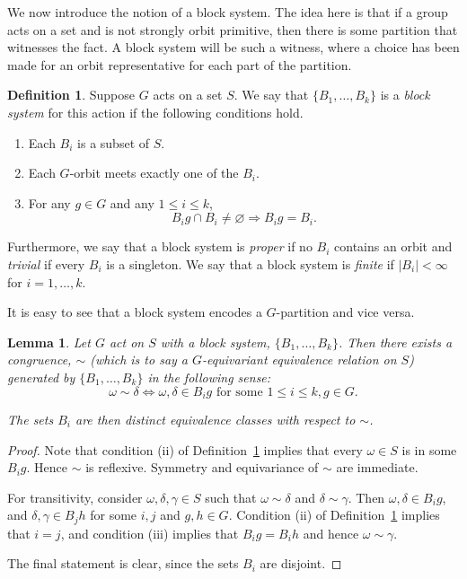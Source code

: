 \documentclass[11pt,a4paper]{amsart}
\renewcommand{\emptyset}{\varnothing}
\newtheorem{lemma}[theorem]{Lemma}
\theoremstyle{definition}
\newtheorem{definition}[theorem]{Definition}
\theoremstyle{remark}
\renewcommand{\implies}{\Rightarrow}
\begin{document}
We now introduce the notion of a block system. The idea here is that if a group acts on a set and is not strongly orbit primitive, then there is some partition that witnesses the fact. A block system will be such a witness, where a choice has been made for an orbit representative for each part of the partition. 

\begin{definition} \label{blocksystem}
	Suppose $G$ acts on a set $S$. We say that $\{ B_1, \ldots, B_k \}$ is a \emph{block system} for this action if the following conditions hold. 
	
	\begin{enumerate}
		\item Each $B_i$ is a subset of $S$.
		\item Each $G$-orbit meets exactly one of the $B_i$.
		\item For any $g \in G$ and any $1 \leq i \leq k$, $$B_i g \cap B_i \neq \emptyset \implies B_i g =B_i.$$   
	\end{enumerate}
	Furthermore, we say that a block system is \emph{proper} if no $B_i$ contains an orbit and \emph{trivial} if every $B_i$ is a singleton. We say that a block system is \emph{finite} if $|B_i|<\infty$ for $i=1,\ldots, k$.
\end{definition}


It is easy to see that a block system encodes a $G$-partition and vice versa. 

\begin{lemma}
	Let $G$ act on $S$ with a block system, $\{ B_1, \ldots, B_k \}$. Then there exists a congruence, $\sim$ (which is to say a $G$-equivariant equivalence relation on $S$) generated by $\{ B_1, \ldots, B_k \}$  in the following sense: 
	$$
	\omega \sim \delta \iff \omega, \delta \in B_i g \text{ for some } 1 \leq i \leq k, g \in G.
	$$
	
	The sets $B_i$ are then distinct equivalence classes with respect to $\sim$. 
\end{lemma}
\begin{proof}
	Note that condition (ii) of Definition~\ref{blocksystem} implies that every $\omega \in S$ is in some $B_i g$. Hence $\sim$ is reflexive. Symmetry and equivariance of $\sim$ are immediate. 
	
	For transitivity, consider $\omega, \delta, \gamma \in S$ such that $\omega\sim \delta$ and $\delta \sim \gamma$. Then $ \omega, \delta \in B_i g$, and $\delta, \gamma \in B_j h$ for some $i,j$ and $g, h \in G$. Condition (ii) of Definition~\ref{blocksystem} implies that $i=j$, and condition (iii) implies that $B_ig = B_ih$ and hence $\omega \sim \gamma$. 
	
	The final statement is clear, since the sets $B_i$ are disjoint.    
\end{proof}
\end{document}
